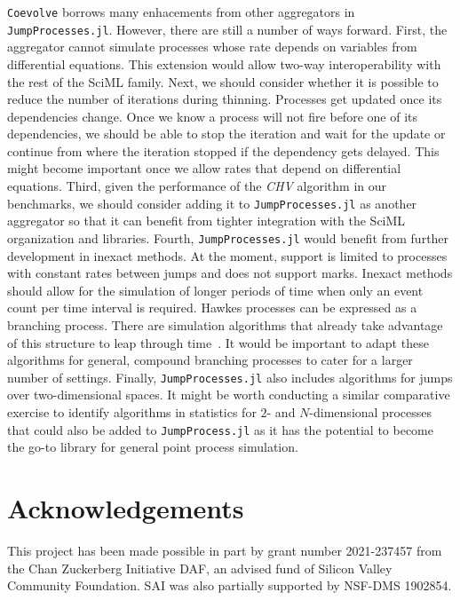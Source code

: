 \documentclass{juliacon}
\begin{document}
\texttt{Coevolve} borrows many enhacements from other aggregators in \texttt{JumpProcesses.jl}. However, there are still a number of ways forward. First, the aggregator cannot simulate processes whose rate depends on variables from differential equations. This extension would allow two-way interoperability with the rest of the SciML family. Next, we should consider whether it is possible to reduce the number of iterations during thinning. Processes get updated once its dependencies change. Once we know a process will not fire before one of its dependencies, we should be able to stop the iteration and wait for the update or continue from where the iteration stopped if the dependency gets delayed. This might become important once we allow rates that depend on differential equations. Third, given the performance of the \textit{CHV} algorithm in our benchmarks, we should consider adding it to \texttt{JumpProcesses.jl} as another aggregator so that it can benefit from tighter integration with the SciML organization and libraries. Fourth, \texttt{JumpProcesses.jl} would benefit from further development in inexact methods. At the moment, support is limited to processes with constant rates between jumps and does not support marks. Inexact methods should allow for the simulation of longer periods of time when only an event count per time interval is required. Hawkes processes can be expressed as a branching process. There are simulation algorithms that already take advantage of this structure to leap through time~\cite{laub2021}. It would be important to adapt these algorithms for general, compound branching processes to cater for a larger number of settings. Finally, \texttt{JumpProcesses.jl} also includes algorithms for jumps over two-dimensional spaces. It might be worth conducting a similar comparative exercise to identify algorithms in statistics for \(2 \)- and \( N \)-dimensional processes that could also be added to \texttt{JumpProcess.jl} as it has the potential to become the go-to library for general point process simulation.

\section{Acknowledgements}
This project has been made possible in part by grant number 2021-237457 from the Chan Zuckerberg Initiative DAF, an advised fund of Silicon Valley Community Foundation. SAI was also partially supported by NSF-DMS 1902854.




\end{document}
